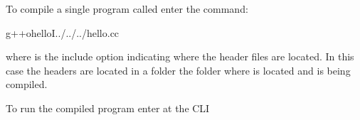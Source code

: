 \documentclass[a4paper,10pt,english]{jupyterBook}
\begin{document}
\begin{sphinxVerbatim}[commandchars=\\\{\}]


\end{sphinxVerbatim}

\sphinxAtStartPar
To compile a single program called  enter the command:

\begin{sphinxVerbatim}[commandchars=\\\{\}]
\PYGZdl{}g++\PYGZhy{}ohello\PYGZhy{}I../../../hello.cc
\end{sphinxVerbatim}

\sphinxAtStartPar
where  is the include option indicating where the header files are located. In this case the headers are located in a folder  the folder where  is located and is being compiled.

\sphinxAtStartPar
To run the compiled program enter  at the CLI

\ignorespaces 
\sphinxstepscope
\end{document}
